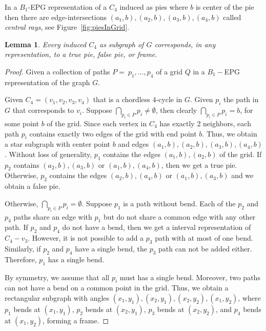 \documentclass[a4paper,11pt]{article}
\newtheorem{lema}[theorem]{Lemma}
\begin{document}
%



In a $B_1$-EPG representation of a $C_4$ induced as pies where $b$ is center of the pie then there are edge-intersections $ (a_1, b), (a_2, b), (a_3, b), (a_4, b)$ called \emph{central rays}, see Figure~\ref{fig:piesInGrid}.






\begin{lema}\label{lem:representacaoC4}
\citep{golumbic2009} Every induced $C_4$  as subgraph of $ G $ corresponds, in any representation, to a true pie, false pie, or frame.
\end{lema}
\begin{proof} Given a collection of paths $ P = \ {p_1, \dots, p_4}$ of a grid $ Q $ in a $ B_1-$EPG representation of the graph $G$.

Given $ C_4 = (v_1, v_2, v_3, v_4) $ that is a chordless 4-cycle in $ G$. Given $p_i$ the path in $ G $ that corresponds to $v_i $.
Suppose $ \displaystyle \bigcap _{p_i \in P} p_i \neq \emptyset $, then clearly $ \displaystyle \bigcap _{p_i \in P} p_i = {b} $, for some point $ b $ of the grid. Since each vertex in $ C_4 $ has exactly 2 neighbors, each path $ p_i $ contains exactly two edges of the grid with end point $ b$. Thus, we obtain a star subgraph with center point $ b $ and edges $ (a_1, b), (a_2, b), (a_3, b), (a_4, b)$.
Without loss of generality, $ p_1 $ contains the edges $ (a_1, b), (a_2, b) $ of the grid. If $ p_2 $ contains $ (a_2, b), (a_3, b) $ or $ (a_1, b), (a_4, b) $, then we get a true pie. Otherwise, $ p_2 $ contains the edges $ (a_2, b), (a_4, b) $ or $ (a_1, b), (a_3, b) $ and we obtain a false pie.

Otherwise, $ \displaystyle \bigcap_ {p_i \in P} p_i = \emptyset$. Suppose $ p_1 $ is a path without bend. Each of the $ p_2 $ and $ p_4 $ paths share an edge with $ p_1 $ but do not share a common edge with any other path. If $ p_2 $ and $ p_4 $ do not have a bend, then we get a interval representation of $ C_4 - v_3 $. However, it is not possible to add a $ p_3 $ path with at most of one bend. Similarly, if $ p_2 $ and $ p_4 $ have a single bend, the $ p_3 $ path can not be added either. Therefore, $ p_1 $ has a single bend.

By symmetry, we assume that all $ p_i $ must has a single bend. Moreover, two paths can not have a bend on a common point in the grid. Thus, we obtain a rectangular subgraph with angles $ (x_1, y_1), (x_2, y_1), (x_2, y_2), (x_1, y_2) $, where $ p_1 $ bends at $ (x_1, y_1) $, $ p_2 $ bends at $ (x_2, y_1) $, $ p_3 $ bends at $ (x_2, y_2) $, and $ p_4 $ bends at $ (x_1, y_2) $, forming a frame.
\end{proof}
\end{document}
